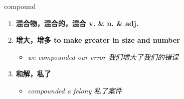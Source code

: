 
\begin{frame}
{\huge compound}
\begin{center}
\begin{enumerate}\Large
  \item \textbf{混合物，混合的，混合 v. \& n. \& adj.}
  \item \textbf{增大，增多 to make greater in size and number}
  \begin{itemize}
    \item \em{\Large{we compounded our error 我们增大了我们的错误}}
  \end{itemize}
  \item \textbf{和解，私了}
  \begin{itemize}
    \item \em{\Large{compounded a felony 私了案件}}
  \end{itemize}
\end{enumerate}
\end{center}
\end{frame}
